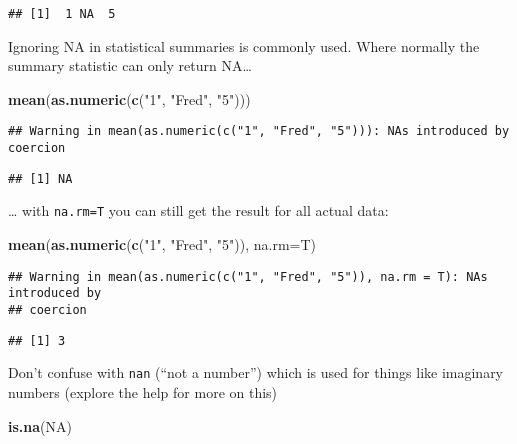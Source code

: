 \documentclass[
]{book}
\newenvironment{Shaded}{\begin{snugshade}}{\end{snugshade}}
\newcommand{\DataTypeTok}[1]{\textcolor[rgb]{0.13,0.29,0.53}{#1}}
\newcommand{\KeywordTok}[1]{\textcolor[rgb]{0.13,0.29,0.53}{\textbf{#1}}}
\newcommand{\NormalTok}[1]{#1}
\newcommand{\OtherTok}[1]{\textcolor[rgb]{0.56,0.35,0.01}{#1}}
\newcommand{\StringTok}[1]{\textcolor[rgb]{0.31,0.60,0.02}{#1}}
\begin{document}
\begin{verbatim}
## [1]  1 NA  5
\end{verbatim}

Ignoring NA in statistical summaries is commonly used. Where normally the summary statistic can only return NA\ldots{}

\begin{Shaded}
\begin{Highlighting}[]
\KeywordTok{mean}\NormalTok{(}\KeywordTok{as.numeric}\NormalTok{(}\KeywordTok{c}\NormalTok{(}\StringTok{"1"}\NormalTok{, }\StringTok{"Fred"}\NormalTok{, }\StringTok{"5"}\NormalTok{)))}
\end{Highlighting}
\end{Shaded}

\begin{verbatim}
## Warning in mean(as.numeric(c("1", "Fred", "5"))): NAs introduced by coercion
\end{verbatim}

\begin{verbatim}
## [1] NA
\end{verbatim}

\ldots{} with \texttt{na.rm=T} you can still get the result for all actual data:

\begin{Shaded}
\begin{Highlighting}[]
\KeywordTok{mean}\NormalTok{(}\KeywordTok{as.numeric}\NormalTok{(}\KeywordTok{c}\NormalTok{(}\StringTok{"1"}\NormalTok{, }\StringTok{"Fred"}\NormalTok{, }\StringTok{"5"}\NormalTok{)), }\DataTypeTok{na.rm=}\NormalTok{T)}
\end{Highlighting}
\end{Shaded}

\begin{verbatim}
## Warning in mean(as.numeric(c("1", "Fred", "5")), na.rm = T): NAs introduced by
## coercion
\end{verbatim}

\begin{verbatim}
## [1] 3
\end{verbatim}

Don't confuse with \texttt{nan} (``not a number'') which is used for things like imaginary numbers (explore the help for more on this)

\begin{Shaded}
\begin{Highlighting}[]
\KeywordTok{is.na}\NormalTok{(}\OtherTok{NA}\NormalTok{)}
\end{Highlighting}
\end{Shaded}
\end{document}

